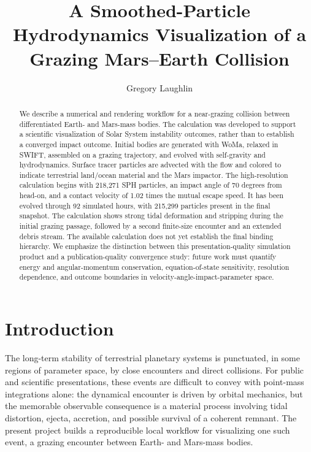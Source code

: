 \documentclass[twocolumn]{aastex631}
\begin{document}
\title{A Smoothed-Particle Hydrodynamics Visualization of a Grazing Mars--Earth Collision}

\author{Gregory Laughlin}

\begin{abstract}
We describe a numerical and rendering workflow for a near-grazing collision
between differentiated Earth- and Mars-mass bodies.  The calculation was
developed to support a scientific visualization of Solar System instability
outcomes, rather than to establish a converged impact outcome.  Initial bodies
are generated with WoMa, relaxed in SWIFT, assembled on a grazing trajectory,
and evolved with self-gravity and hydrodynamics.  Surface tracer particles are
advected with the flow and colored to indicate terrestrial land/ocean material
and the Mars impactor.  The high-resolution calculation begins with 218,271 SPH
particles, an impact angle of 70 degrees from head-on, and a contact velocity of
1.02 times the mutual escape speed.  It has been evolved through 92 simulated
hours, with 215,299 particles present in the final snapshot.  The calculation
shows strong tidal deformation and stripping during the initial grazing passage,
followed by a second finite-size encounter and an extended debris stream.  The
available calculation does not yet establish the final binding hierarchy.  We
emphasize the
distinction between this presentation-quality simulation product and a
publication-quality convergence study: future work must quantify energy and
angular-momentum conservation, equation-of-state sensitivity, resolution
dependence, and outcome boundaries in velocity-angle-impact-parameter space.
\end{abstract}


\section{Introduction}

The long-term stability of terrestrial planetary systems is punctuated, in
some regions of parameter space, by close encounters and direct collisions.
For public and scientific presentations, these events are difficult to convey
with point-mass integrations alone: the dynamical encounter is driven by
orbital mechanics, but the memorable observable consequence is a material
process involving tidal distortion, ejecta, accretion, and possible survival of
a coherent remnant.  The present project builds a reproducible local workflow
for visualizing one such event, a grazing encounter between Earth- and
Mars-mass bodies.
\end{document}
